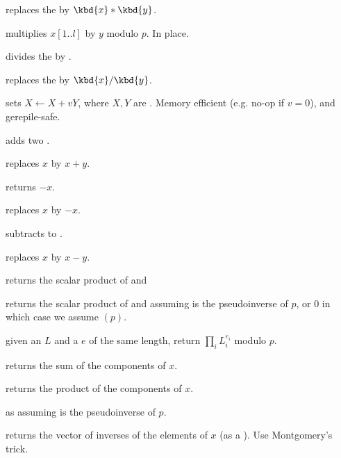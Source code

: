  replaces
the   by $\kbd{x}*\kbd{y}$.

multiplies $x[1..l]$ by $y$ modulo $p$. In place.

 divides the 
 by .

 replaces
the   by $\kbd{x}/\kbd{y}$.

sets $X\leftarrow X + vY$, where $X,Y$ are . Memory efficient (e.g.
no-op if $v = 0$), and gerepile-safe.

 adds two .

 replaces
$x$ by $x+y$.

 returns $-x$.

 replaces $x$ by $-x$.

 subtracts  to .

 replaces $x$ by $x-y$.

 returns the scalar product
of  and 

 returns the
scalar product of  and  assuming  is the pseudoinverse of
$p$, or $0$ in which case we assume $(p)$.

 given an  $L$
and a  $e$ of the same length, return $\prod_i L_i^{e_i}$ modulo $p$.

 returns the sum of the components of $x$.

 returns the product of the components of
$x$.

 as 
assuming  is the pseudoinverse of $p$.

 returns the vector of inverses of the
elements of $x$ (as a ). Use Montgomery's trick.

